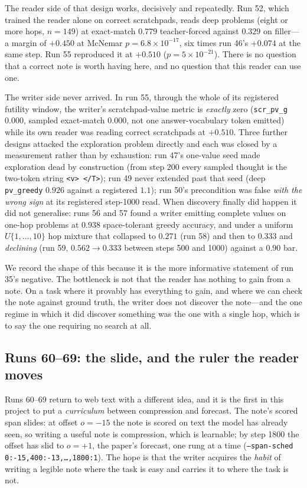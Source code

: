 \documentclass{article} %
\begin{document}
The reader side of that design works, decisively and repeatedly. Run 52, which trained the reader
alone on correct scratchpads, reads deep problems (eight or more hops, $n{=}149$) at exact-match
$0.779$ teacher-forced against $0.329$ on filler---a margin of $+0.450$ at McNemar
$p = 6.8\times10^{-17}$, six times run 46's $+0.074$ at the same step. Run 55 reproduced it at
$+0.510$ ($p = 5\times10^{-21}$). There is no question that a correct note is worth having here,
and no question that this reader can use one.

The writer side never arrived. In run 55, through the whole of its registered futility window, the
writer's scratchpad-value metric is \emph{exactly} zero (\texttt{scr\_pv\_g} $0.000$, sampled
exact-match $0.000$, not one answer-vocabulary token emitted) while its own reader was reading
correct scratchpads at $+0.510$. Three further designs attacked the exploration problem directly and
each was closed by a measurement rather than by exhaustion: run 47's one-value seed made exploration
dead by construction (from step 200 every sampled thought is the two-token string
\verb|<v> </T>|); run 49 never extended past that seed (deep \texttt{pv\_greedy} $0.926$ against a
registered $1.1$); run 50's precondition was false \emph{with the wrong sign} at its registered
step-1000 read. When discovery finally did happen it did not generalise: runs 56 and 57 found a
writer emitting complete values on one-hop problems at $0.938$ space-tolerant greedy accuracy, and
under a uniform $U\{1,\dots,10\}$ hop mixture that collapsed to $0.271$ (run 58) and then to $0.333$
and \emph{declining} (run 59, $0.562 \to 0.333$ between steps 500 and 1000) against a $0.90$ bar.

We record the shape of this because it is the more informative statement of run 35's negative. The
bottleneck is not that the reader has nothing to gain from a note. On a task where it provably has
everything to gain, and where we can check the note against ground truth, the writer does not
discover the note---and the one regime in which it did discover something was the one with a single
hop, which is to say the one requiring no search at all.

\subsection{Runs 60--69: the slide, and the ruler the reader moves}
\label{sec:slide}

Runs 60--69 return to web text with a different idea, and it is the first in this project to put a
\emph{curriculum} between compression and forecast. The note's scored span slides: at offset
$o = -15$ the note is scored on text the model has already seen, so writing a useful note is
compression, which is learnable; by step 1800 the offset has slid to $o = +1$, the paper's forecast,
one rung at a time (\texttt{--span-sched 0:-15,400:-13,\dots,1800:1}). The hope is that the writer
acquires the \emph{habit} of writing a legible note where the task is easy and carries it to where
the task is not.
\end{document}
